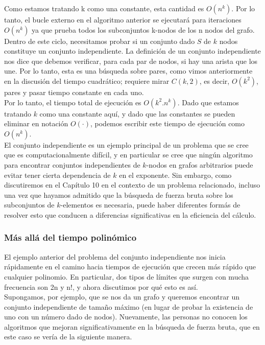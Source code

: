 \documentclass[a4paper]{article}
\begin{document}
Como estamos tratando k como una constante, esta cantidad es $O(n^k)$. Por lo tanto, el bucle externo en el algoritmo anterior se ejecutará para iteraciones $O(n^k)$ ya que prueba todos los subconjuntos k-nodos de los n nodos del grafo.\\

Dentro de este ciclo, necesitamos probar si un conjunto dado $S$ de $k$ nodos constituye un conjunto independiente. La definición de un conjunto independiente nos dice que debemos verificar, para cada par de nodos, si hay una arista que los une. Por lo tanto, esta es una búsqueda sobre pares, como vimos anteriormente en la discusión del tiempo cuadrático; requiere mirar $C(k,2)$, es decir, $O(k^2)$, pares y pasar tiempo constante en cada uno.\\

Por lo tanto, el tiempo total de ejecución es $O(k^2.n^k)$. Dado que estamos tratando $k$ como una constante aquí, y dado que las constantes se pueden eliminar en notación $O(·)$, podemos escribir este tiempo de ejecución como $O(n^k)$.\\

El conjunto independiente es un ejemplo principal de un problema que se cree que es
computacionalmente difícil, y en particular se cree que ningún algoritmo para encontrar conjuntos independientes de $k$-nodos en grafos arbitrarios puede evitar tener cierta dependencia de $k$ en el exponente. Sin embargo, como discutiremos en el Capítulo 10 en el contexto de un problema relacionado, incluso una vez que hayamos admitido que la búsqueda de fuerza bruta sobre los subconjuntos de $k$-elementos es necesaria, puede haber diferentes formás de resolver esto que conducen a diferencias significativas en la eficiencia del cálculo.\\


\subsubsection*{Más allá del tiempo polinómico} 

El ejemplo anterior del problema del conjunto independiente nos inicia rápidamente en el camino hacia tiempos de ejecución que crecen más rápido que cualquier polinomio. En particular, dos tipos de límites que surgen con mucha frecuencia son 2n y n!, y ahora discutimos por qué esto es así.\\

Supongamos, por ejemplo, que se nos da un grafo y queremos encontrar un conjunto independiente de tamaño máximo (en lugar de probar la existencia de uno con un número dado de nodos). Nuevamente, las personas no conocen los algoritmos que mejoran significativamente en la búsqueda de fuerza bruta, que en este caso se vería de la siguiente manera.
 
\end{document}

